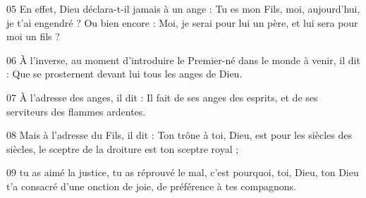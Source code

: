 
05 En effet, Dieu déclara-t-il jamais à un ange : Tu es mon Fils, moi, aujourd’hui, je t’ai engendré ? Ou bien encore : Moi, je serai pour lui un père, et lui sera pour moi un fils ?

06 À l’inverse, au moment d’introduire le Premier-né dans le monde à venir, il dit : Que se prosternent devant lui tous les anges de Dieu.

07 À l’adresse des anges, il dit : Il fait de ses anges des esprits, et de ses serviteurs des flammes ardentes.

08 Mais à l’adresse du Fils, il dit : Ton trône à toi, Dieu, est pour les siècles des siècles, le sceptre de la droiture est ton sceptre royal ;

09 tu as aimé la justice, tu as réprouvé le mal, c’est pourquoi, toi, Dieu, ton Dieu t’a consacré d’une onction de joie, de préférence à tes compagnons.
